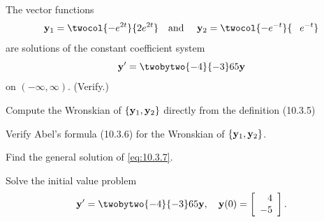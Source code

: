 \setcounter{example}{1}
\setcounter{equation}{6}
\begin{example}
  \label{example:10.3.2} \rm The vector functions
  \[
    {\bf y}_{1}=\twocol{-e^{2t}}{2e^{2t}}\mbox{\quad and \quad}{\bf y}_{2}=\twocol{-e^{-t}}{\phantom{-}e^{-t}}
  \]
  are solutions of the constant coefficient system
  \begin{equation}
    \label{eq:10.3.7}{\bf y}'=\twobytwo{-4}{-3}65{\bf y}
  \end{equation}
  on $(-\infty,\infty)$. (Verify.)
  \begin{alist}
    \item %
    Compute the Wronskian of $\{{\bf y}_{1},{\bf y}_{2}\}$ directly from the definition
    \textup{(10.3.5)}

    \item %
    Verify Abel's formula \textup{(10.3.6)} for the Wronskian of $\{{\bf y}_{1},{\bf y}_{2}\}$.

    \item %
    Find the general solution of \eqref{eq:10.3.7}.

    \item %
    Solve the initial value problem
    \begin{equation}
      \label{eq:10.3.8}{\bf y}'=\twobytwo{-4}{-3}65{\bf y},\quad{\bf y}(0)= \left[
      \begin{array}{r}
        4  \\
        -5
      \end{array}\right].
    \end{equation}
  \end{alist}
\end{example}
\setcounter{equation}{8}
